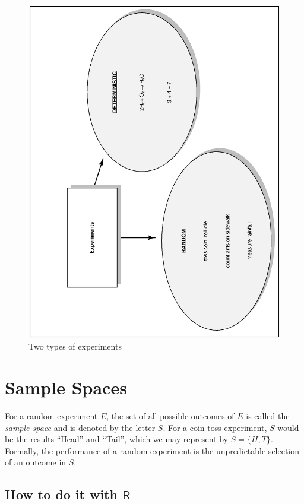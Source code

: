 \documentclass[captions=tableheading]{scrbook}
\begin{document}
\begin{figure}[th]
  \includegraphics[angle=270, totalheight=4in]{ps/prob/diagram.ps}
  \caption[Two types of experiments]{Two types of experiments}
  \label{fig-diagram}
\end{figure}
\section{Sample Spaces}
\label{sec-4-1}
\label{sec-Sample-Spaces}


For a random experiment \(E\), the set of all possible outcomes of \(E\) is called the \emph{sample space} and is denoted by the letter \(S\). For a coin-toss experiment, \(S\) would be the results ``Head'' and ``Tail'', which we may represent by \( S = \{H,T \} \). Formally, the performance of a random experiment is the unpredictable selection of an outcome in \(S\).
\subsection{How to do it with \(\mathsf{R}\)}
\label{sec-4-1-1}
\end{document}
